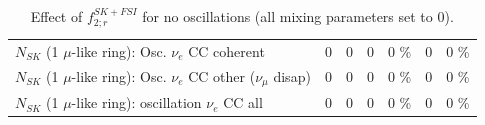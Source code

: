 \begin{table}
\begin{tabular}{| l | r | r | r  r | r  r |}
                          $N_{SK}$ (1 $\mu$-like ring): Osc. $\nu_e$ CC coherent &               0 &               0 &               0 &        0 \%  &               0 &        0 \%  \\ 
           $N_{SK}$ (1 $\mu$-like ring): Osc. $\nu_e$ CC other ($\nu_\mu$ disap) &               0 &               0 &               0 &        0 \%  &               0 &        0 \%  \\ 
                        $N_{SK}$ (1 $\mu$-like ring): oscillation $\nu_e$ CC all &               0 &               0 &               0 &        0 \%  &               0 &        0 \%  \\ 
\hline
\hline
\end{tabular}
\caption{ Effect of $f_{2; r}^{SK+FSI}$ for no oscillations (all mixing parameters set to 0). }
\label{tab:num_skdetfsi_002_1RmuT_3f_osc_t13:0_spectralreco_spectraltrue}
\end{table}
\clearpage

